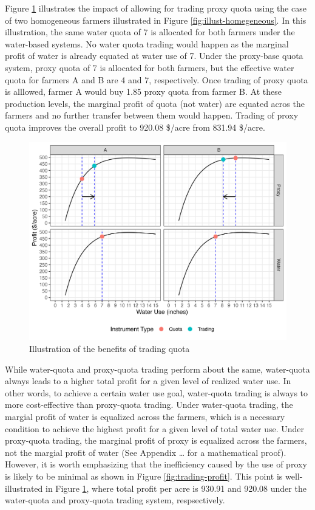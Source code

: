 \documentclass[
]{article}
\begin{document}
Figure \ref{fig:trading-profit-illustration} illustrates the impact of allowing for trading proxy quota using the case of two homogeneous farmers illustrated in Figure \ref{fig:illust-homegeneous}. In this illustration, the same water quota of 7 is allocated for both farmers under the water-based systems. No water quota trading would happen as the marginal profit of water is already equated at water use of 7. Under the proxy-base quota system, proxy quota of 7 is allocated for both farmers, but the effective water quota for farmers A and B are 4 and 7, respectively. Once trading of proxy quota is alllowed, farmer A would buy 1.85 proxy quota from farmer B. At these production levels, the marginal profit of quota (not water) are equated acros the farmers and no further transfer between them would happen. Trading of proxy quota improves the overall profit to 920.08 \$/acre from 831.94 \$/acre.

\begin{figure}[H]

{\centering \includegraphics{figures/g_illustration_homogeneous_with_trade} 

}

\caption{Illustration of the benefits of trading quota}\label{fig:trading-profit-illustration}
\end{figure}

While water-quota and proxy-quota trading perform about the same, water-quota always leads to a higher total profit for a given level of realized water use. In other words, to achieve a certain water use goal, water-quota trading is always to more cost-effective than proxy-quota trading. Under water-quota trading, the margial profit of water is equalized across the farmers, which is a necessary condition to achieve the highest profit for a given level of total water use. Under proxy-quota trading, the marginal profit of proxy is equalized across the farmers, not the margial profit of water (See Appendix \ldots{} for a mathematical proof). However, it is worth emphasizing that the inefficiency caused by the use of proxy is likely to be minimal as shown in Figure \ref{fig:trading-profit}. This point is well-illustrated in Figure \ref{fig:trading-profit-illustration}, where total profit per acre is 930.91 and 920.08 under the water-quota and proxy-quota trading system, respsectively.
\end{document}
